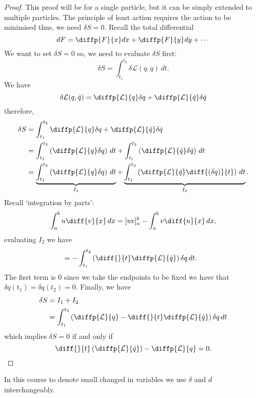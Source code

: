 \documentclass[12pt, a4paper]{article}
\begin{document}
\begin{proof}
    This proof will be for a single particle, but it can be simply extended to multiple particles. The principle of least action requires the action to be minimised thus, we need \(\delta S=0\). Recall the total differential
    \[dF = \diffp{F}{x} dx + \diffp{F}{y} dy +\cdots\]
    We want to set \(\delta S =0\) so, we need to evaluate \(\delta S\) first:
    \[\delta S = \int_{t_1}^{t_2} \delta \mathcal{L}(q,\dot{q}) \, dt.\]
    We have 
    \[\delta \mathcal{L}(q,\dot{q}) =  \diffp{\mathcal{L}}{q} \delta q+ \diffp{\mathcal{L}}{{\dot{q}}} \delta \dot{q}\]
    therefore,
    \[\begin{aligned}
        \delta S &= \int_{t_1}^{t_2}  \diffp{\mathcal{L}}{q} \delta q+ \diffp{\mathcal{L}}{{\dot{q}}} \delta \dot{q} \\
        &= \int_{t_1}^{t_2} \left( \diffp{\mathcal{L}}{q} \delta q \right) \, dt +\int_{t_1}^{t_2} \left( \diffp{\mathcal{L}}{{\dot{q}}} \delta \dot{q} \right) \, dt \\
        &= \underbrace{\int_{t_1}^{t_2} \left( \diffp{\mathcal{L}}{q} \delta q \right) \, dt}_{I_1} +\underbrace{\int_{t_1}^{t_2} \left( \diffp{\mathcal{L}}{{\dot{q}}} \diff{(\delta q)}{t} \right) \, dt}_{I_2}.
    \end{aligned}\]
    Recall `integration by parts':
    \[\int_{a}^{b} u\diff{v}{x} \, dx = [uv]_a^b - \int_{a}^{b} v\diff{u}{x} \, dx,\]
    evaluating \(I_2\) we have
    \[\begin{aligned}
        &= - \int_{t_1}^{t_2} \left( \diff{}{t} \diffp{\mathcal{L}}{{\dot{q}}}  \right) \delta q \, dt.
    \end{aligned}\]
    The first term is \(0\) since we take the endpoints to be fixed we have that \(\delta q(t_1) = \delta q(t_2)=0\). Finally, we have 
    \[\begin{aligned}
        \delta S &= I_1 + I_2 \\
                &= \int_{t_1}^{t_2} \left( \diffp{\mathcal{L}}{q} - \diff{}{t} \diffp{\mathcal{L}}{{\dot{q}}} \right) \delta q \, dt
    \end{aligned}\]
    which implies \(\delta S =0\) if and only if
    \[\diff{}{t} \left( \diffp{\mathcal{L}}{{\dot{q}}} \right) - \diffp{\mathcal{L}}{q}=0.\]
\end{proof}

\begin{mdnote}
    In this course to denote small changed in variables we use \(\delta\) and \(d\)\\ interchangeably.
\end{mdnote}
\end{document}
